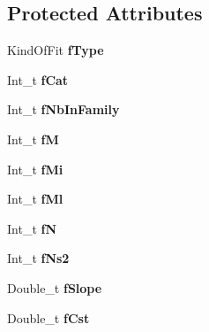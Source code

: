\subsection*{Protected Attributes}
\begin{DoxyCompactItemize}
\item 
\hypertarget{classTSplineFit_a27ec9c874502a7d02f0933f797f633e5}{Kind\-Of\-Fit {\bfseries f\-Type}}\label{classTSplineFit_a27ec9c874502a7d02f0933f797f633e5}

\item 
\hypertarget{classTSplineFit_a2e22ab428ef340225367d385bd1693c6}{Int\-\_\-t {\bfseries f\-Cat}}\label{classTSplineFit_a2e22ab428ef340225367d385bd1693c6}

\item 
\hypertarget{classTSplineFit_abd1f65d49197fc36e46d5d441c8070bc}{Int\-\_\-t {\bfseries f\-Nb\-In\-Family}}\label{classTSplineFit_abd1f65d49197fc36e46d5d441c8070bc}

\item 
\hypertarget{classTSplineFit_a5f52174a10d63f789f9610932a1e2664}{Int\-\_\-t {\bfseries f\-M}}\label{classTSplineFit_a5f52174a10d63f789f9610932a1e2664}

\item 
\hypertarget{classTSplineFit_ae02d6f36802b3d4a9acead1e962f18b1}{Int\-\_\-t {\bfseries f\-Mi}}\label{classTSplineFit_ae02d6f36802b3d4a9acead1e962f18b1}

\item 
\hypertarget{classTSplineFit_a8d87c94fd29545ca18672aa7528f2736}{Int\-\_\-t {\bfseries f\-Ml}}\label{classTSplineFit_a8d87c94fd29545ca18672aa7528f2736}

\item 
\hypertarget{classTSplineFit_a60fd672ec09a2eb1568b76f6f86878a7}{Int\-\_\-t {\bfseries f\-N}}\label{classTSplineFit_a60fd672ec09a2eb1568b76f6f86878a7}

\item 
\hypertarget{classTSplineFit_a77af9837bc54fb6247f32c39ce7fb253}{Int\-\_\-t {\bfseries f\-Ns2}}\label{classTSplineFit_a77af9837bc54fb6247f32c39ce7fb253}

\item 
\hypertarget{classTSplineFit_ad48530b722c5828efa51486145d14e0e}{Double\-\_\-t {\bfseries f\-Slope}}\label{classTSplineFit_ad48530b722c5828efa51486145d14e0e}

\item 
\hypertarget{classTSplineFit_ad1e03020cfbde1ddec5652c78b30ce47}{Double\-\_\-t {\bfseries f\-Cst}}\label{classTSplineFit_ad1e03020cfbde1ddec5652c78b30ce47}


\end{DoxyCompactItemize}
